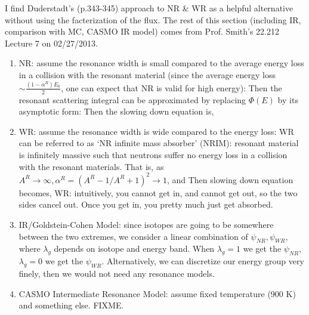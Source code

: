 \documentclass{school-22.211-notes}
\begin{document}
\clearpage
{} 
I find Duderstadt's (p.343-345) approach to NR \& WR as a helpful alternative without using the facterization of the flux. The rest of this section (including IR, comparison with MC, CASMO IR model) comes from Prof. Smith's 22.212 Lecture 7 on 02/27/2013. 
\begin{enumerate}
\item NR: assume the resonance width is small compared to the average energy loss in a collision with the resonant material (since the average energy loss $\sim \frac{(1-\alpha^R)E_0}{2}$, one can expect that NR is valid for high energy): 
  Then the resonant scattering integral can be approximated by replacing $\Phi(E)$ by its asymptotic form: 
  Then the slowing down equation is, 

\item WR: assume the resonance width is wide compared to the energy loss: 
  WR can be referred to as `NR infinite mass absorber' (NRIM): resonant material is infinitely massive such that neutrons suffer no energy loss in a collision with the resonant materials. That is, as $A^R \to \infty, \alpha^R = (A^R - 1/A^R + 1)^2 \to 1$, and 
  Then slowing down equation becomes, 
  WR: intuitively, you cannot get in, and cannot get out, so the two sides cancel out. Once you get in, you pretty much just get absorbed. 

\item IR/Goldstein-Cohen Model: since isotopes are going to be somewhere between the two extremes, we consider a linear combination of $\psi_{NR}, \psi_{WR}$, 
where $\lambda_g$ depends on isotope and energy band. When $\lambda_g = 1$ we get the $\psi_{NR}$, $\lambda_g = 0$ we get the $\psi_{WR}$. Alternatively, we can discretize our energy group very finely, then we would not need any resonance models.

\item CASMO Intermediate Resonance Model: assume fixed temperature (900 K) and something else. FIXME. 
\end{enumerate}
\end{document}
